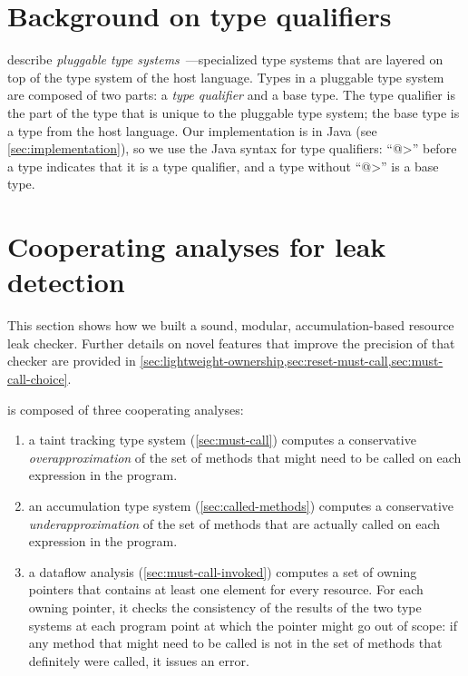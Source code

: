 \section{Background on type qualifiers}
\label{sec:background}

 describe
\emph{pluggable type systems}~\cite{FosterFFA99}---specialized type
systems that are layered on top of the type system of the host
language.  Types in a pluggable type system are composed of two parts:
a \emph{type qualifier} and a base type. The type qualifier is the
part of the type that is unique to the pluggable type system; the base
type is a type from the host language. Our implementation is in Java
(see \cref{sec:implementation}), so we use the Java syntax for type
qualifiers: ``\<@>'' before a type indicates that it is a type
qualifier, and a type without ``\<@>'' is a base type.


\section{Cooperating analyses for leak detection}
\label{sec:base-type-systems}

This section shows how we built a sound, modular, accumulation-based
resource leak checker.
Further details on novel features that improve the precision
of that checker are provided in
\cref{sec:lightweight-ownership,sec:reset-must-call,sec:must-call-choice}.

\Tool is composed of three cooperating analyses:
\begin{enumerate}
\item a taint tracking type system (\cref{sec:must-call}) computes a conservative
  \emph{overapproximation} of the set of methods that might need to be called
  on each expression in the program.
\item an accumulation type system (\cref{sec:called-methods}) computes
  a conservative \emph{underapproximation} of the set of methods that are
  actually called on each expression in the program.
\item a dataflow analysis (\cref{sec:must-call-invoked}) computes a set
  of owning pointers that contains at least one element for every resource.
  For each owning pointer, it checks the consistency of the results
  of the two type systems at each program
  point at which the pointer might go out of scope:
  if any method that might need to be called is not in the set of methods
  that definitely were called, it issues an error.
\end{enumerate}

